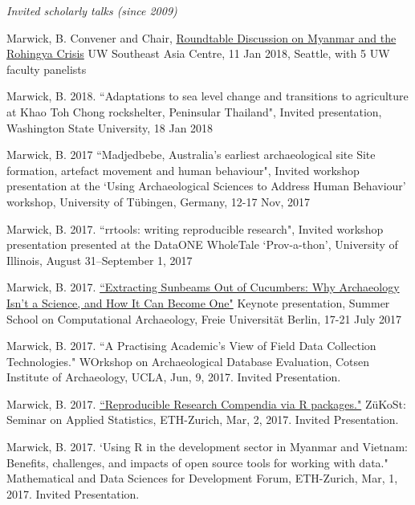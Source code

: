 

\medskip

\noindent\emph{Invited scholarly talks (since 2009)\vspace{0.01in}}

\medskip


\ind Marwick, B. Convener and Chair, \href{https://jsis.washington.edu/seac/news/roundtable-discussion-myanmar-rohingya-crisis-2/}{Roundtable Discussion on Myanmar and the Rohingya Crisis} UW Southeast Asia Centre, 11 Jan 2018, Seattle, with 5 UW faculty panelists 

\ind Marwick, B. 2018. ``Adaptations to sea level change and transitions to agriculture at Khao Toh Chong rockshelter, Peninsular Thailand", Invited presentation, Washington State University, 18 Jan 2018

\ind Marwick, B. 2017 ``Madjedbebe, Australia's earliest archaeological site Site formation, artefact movement and human behaviour", Invited workshop presentation at the ‘Using Archaeological Sciences to Address Human Behaviour’ workshop, University of Tübingen, Germany, 12-17 Nov, 2017

\ind Marwick, B. 2017. ``rrtools: writing reproducible research", Invited workshop presentation presented at the DataONE WholeTale ‘Prov-a-thon’, University of Illinois, August 31–September 1, 2017

\ind Marwick, B. 2017. \href{https://github.com/benmarwick/berlinsummerschoolkeynote}{``Extracting Sunbeams Out of Cucumbers: Why Archaeology Isn't a Science, and How It Can Become One"} Keynote presentation, Summer School on Computational Archaeology, Freie Universität Berlin, 17-21 July 2017

\ind Marwick, B. 2017. ``A Practising Academic’s View of Field Data Collection Technologies." WOrkshop on Archaeological Database Evaluation, Cotsen Institute of Archaeology, UCLA,  Jun, 9, 2017. Invited Presentation.

\ind Marwick, B. 2017. \href{https://github.com/benmarwick/ETH-Zurich-ZuKoSt-Reproducible-Research-Compendia-via-R-packages}{``Reproducible Research Compendia via R packages."} ZüKoSt: Seminar on Applied Statistics, ETH-Zurich,  Mar, 2, 2017. Invited Presentation.

\ind Marwick, B. 2017. `Using R in the development sector in Myanmar and Vietnam: Benefits, challenges, and impacts of open source tools for working with data." Mathematical and Data Sciences for Development Forum, ETH-Zurich,  Mar, 1, 2017. Invited Presentation.

